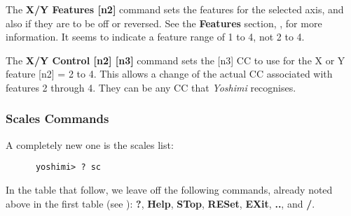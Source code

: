    The \textbf{X/Y Features [n2]} command sets the features for the
   selected axis, and also if they are to be off or reversed.
   See the \textbf{Features} section,
   , for more information.
   It seems to indicate a feature range of 1 to 4, not 2 to 4.

   The \textbf{X/Y Control [n2] [n3]} command
   sets the [n3] CC to use for the X or Y feature [n2] = 2 to 4. 
   This allows a change of the actual CC associated with features 2 through 4.
   They can be any CC that \textsl{Yoshimi} recognises.

\subsubsection{Scales Commands}
\label{subsec:command_line_scales_command_list}

   A completely new one is the scales list:

   \begin{verbatim}
      yoshimi> ? sc
   \end{verbatim}

   In the table that follow, we leave off the following commands, already noted
   above in the first table
   (see ):
   \textbf{?}, \textbf{Help}, \textbf{STop}, \textbf{RESet},
   \textbf{EXit}, \textbf{..}, and \textbf{/}.

